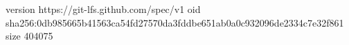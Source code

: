 version https://git-lfs.github.com/spec/v1
oid sha256:0db985665b41563ca54fd27570da3fddbe651ab0a0c932096de2334c7e32f861
size 404075
